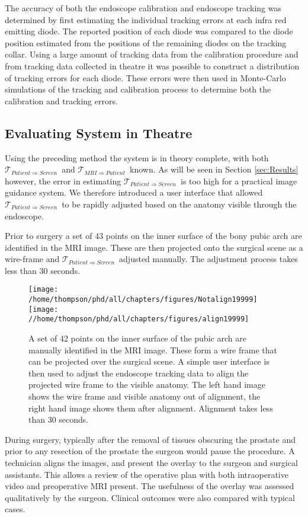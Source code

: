 \documentclass[3p,twocolumn,preprint,10pt]{elsarticle}
\newcommand{\Tpreop}{$\mathcal{T}_{MRI \Rightarrow Patient}$}
\newcommand{\Tlens}{$\mathcal{T}_{Patient \Rightarrow Screen}$}
\begin{document}
The accuracy of both the endoscope calibration and endoscope tracking was determined
by first estimating the individual tracking errors at each infra red emitting diode.
The reported position of each diode was compared to the diode position 
estimated from the positions of the remaining diodes on the 
tracking collar. Using a large amount of tracking data from the calibration 
procedure and from tracking data collected in theatre it was possible to construct 
a distribution of tracking errors for each diode. These errors were then used in 
Monte-Carlo simulations of the tracking and calibration process to determine both the
calibration and tracking errors.
\subsection{Evaluating System in Theatre}
Using the preceding method the system is in theory complete, with both \Tlens \ and \Tpreop \
known.
As will be seen in Section \ref{sec:Results} however, the error in estimating \Tlens \ is 
too high for a practical image guidance system. We therefore introduced a user interface that
allowed \Tlens \ to be rapidly adjusted based on the anatomy visible through the endoscope. 

Prior to surgery a set of 43 points on the inner surface of the bony pubic arch are identified
in the MRI image. These are then projected onto the surgical scene as a wire-frame 
and \Tlens \ adjusted manually. The adjustment process takes less than 30 seconds.
\begin{figure*}
\begin{center}
\texttt{[image: /home/thompson/phd/all/chapters/figures/Notalign19999]}
\texttt{[image: //home/thompson/phd/all/chapters/figures/align19999]}
\end{center}
\caption{\label{fig:Alignment}A set of 42 points on the inner surface of the pubic arch 
are manually identified in the MRI image. These form a wire frame that can be projected 
over the surgical scene. A simple user interface is then used to adjust the 
endoscope tracking data to align the projected wire frame to the visible anatomy. 
The left hand image shows the wire frame and visible anatomy out of alignment, the right hand
image shows them after alignment. 
Alignment takes less than 30 seconds.}
\end{figure*}

During surgery, typically after the removal of tissues obscuring the prostate and 
prior to any resection of the prostate the surgeon would pause
the procedure. A technician aligns the images, and present the overlay to the 
surgeon and surgical assistants. This allows a review of the operative plan with 
both intraoperative video and preoperative MRI present. The usefulness of the 
overlay was assessed qualitatively by the surgeon. Clinical outcomes were also compared 
with typical cases.
\end{document}
